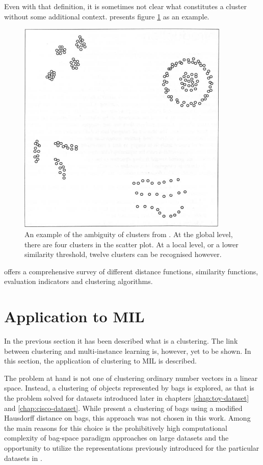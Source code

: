 Even with that definition, it is sometimes not clear what constitutes a cluster without some additional context. \cite{jain_algorithms_1988} presents figure \ref{fig:cluster-ambiguity} as an example.

\begin{figure}[ht]
	\centering
	\includegraphics[width=0.9\textwidth]{images/cluster-ambiguity.png}
	\caption{An example of the ambiguity of clusters from \cite{jain_algorithms_1988}. At the global level, there are four clusters in the scatter plot. At a local level, or a lower similarity threshold, twelve clusters can be recognised however.}\label{fig:cluster-ambiguity}
\end{figure}

\cite{xu_comprehensive_2015} offers a comprehensive survey of different distance functions, similarity functions, evaluation indicators and clustering algorithms.

\section{Application to MIL}\label{sec:mil-clustering}

In the previous section it has been described what is a clustering. The link between clustering and multi-instance learning is, however, yet to be shown. In this section, the application of clustering to MIL is described.

The problem at hand is not one of clustering ordinary number vectors in a linear space. Instead, a clustering of objects represented by bags is explored, as that is the problem solved for datasets introduced later in chapters \ref{chap:toy-dataset} and \ref{chap:cisco-dataset}. While \cite{wang_solving_2000} present a clustering of bags using a modified Hausdorff distance on bags, this approach was not chosen in this work. Among the main reasons for this choice is the prohibitively high computational complexity of bag-space paradigm approaches on large datasets and the opportunity to utilize the representations previously introduced for the particular datasets in \cite{dedic_hierarchicke_2017}.

